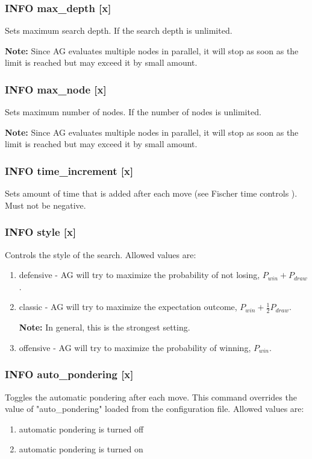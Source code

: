 \documentclass[12pt,a4paper]{article}
\begin{document}
\subsubsection{INFO max{\_}depth [x]}
Sets maximum search depth. If  the search depth is unlimited.

\textbf{Note:} Since AG evaluates multiple nodes in parallel, it will stop as soon as the limit is reached but may exceed it by small amount.

\subsubsection{INFO max{\_}node [x]}
Sets maximum number of nodes. If  the number of nodes is unlimited.

\textbf{Note:} Since AG evaluates multiple nodes in parallel, it will stop as soon as the limit is reached but may exceed it by small amount.

\subsubsection{INFO time{\_}increment [x]}
Sets amount of time that is added after each move (see Fischer time controls \cite{fischer}). Must not be negative.

\subsubsection{INFO style [x]}
Controls the style of the search. Allowed values are:
\begin{enumerate}[leftmargin=7.5em]
	\item[\text{$[x]=0$}]{defensive - AG will try to maximize the probability of not losing, $P_{win} + P_{draw}$.}
	\item[\text{$[x]=1$}]{classic - AG will try to maximize the expectation outcome, $P_{win} + \frac{1}{2}P_{draw}$.
	
	\textbf{Note:} In general, this is the strongest setting.}
	\item[\text{$[x]=2$}]{offensive - AG will try to maximize the probability of winning, $P_{win}$.}
\end{enumerate}

\subsubsection{INFO auto{\_}pondering [x]}
Toggles the automatic pondering after each move. This command overrides the value of "auto{\_}pondering" loaded from the configuration file. Allowed values are:
\begin{enumerate}[leftmargin=7.5em]
	\item[\text{$[x]=0$}]{automatic pondering is turned off}
	\item[\text{$[x]=1$}]{automatic pondering is turned on}
\end{enumerate}
\end{document}
